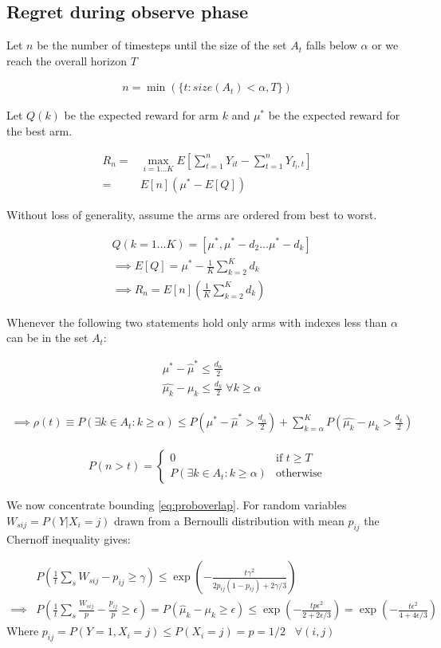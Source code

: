 \documentclass{article}
\newcommand{\eqn}[1]{\begin{align}#1\end{align}}
\theoremstyle{plain}
\theoremstyle{definition}
\begin{document}
\subsection{Regret during observe phase}

Let $n$ be the number of timesteps until the size of the set $A_t$ falls below $\alpha$ or we reach the overall horizon $T$

\eqn {
n = \min(\{t:size(A_t)< \alpha, T\})
}

Let $Q(k)$ be the expected reward for arm $k$ and $\mu^*$ be the expected reward for the best arm.

\eqn {
R_n = & \max_{i=1...K} E\left[\sum_{t=1}^n Y_{it} - \sum_{t=1}^n Y_{I_t,t} \right] \\
= & E[n]\left(\mu^*  - E[Q]\right) 
}

Without loss of generality, assume the arms are ordered from best to worst.

\eqn{
& Q(k = 1...K) = [\mu^*, \mu^*-d_2 ... \mu^*-d_k] \\
&\implies E[Q] = \mu^* - \frac{1}{K}\sum_{k=2}^K d_k \\
&\implies  R_n = E[n]\left(\frac{1}{K}\sum_{k=2}^K d_k \right)
}

Whenever the following two statements hold only arms with indexes less than $\alpha$ can be in the set $A_t$:

\eqn {
& \mu^* - \hat{\mu}^* \leq \frac{d_\alpha}{2} \\
& \hat{\mu_k} - \mu_k \leq \frac{d_k}{2} \; \forall k \geq \alpha 
}

\eqn{
\label{eq:proboverlap}
\implies \rho(t) \equiv P(\exists k \in A_t: k \geq \alpha)  \leq P(\mu^* - \hat{\mu}^* > \frac{d_\alpha}{2}) + \sum_{k=\alpha}^K P( \hat{\mu_k} - \mu_k > \frac{d_k}{2})
}


\eqn {
P(n > t) = \begin{cases} 0 & \text{if } t \geq T \\
P(\exists k \in A_t: k \geq \alpha) & \text{otherwise}
\end{cases}
}


We now concentrate bounding \ref{eq:proboverlap}. For random variables $W_{sij} = P(Y|X_i=j)$ drawn from a Bernoulli distribution with mean $p_{ij}$ the Chernoff inequality gives:

\eqn {
& P(\frac{1}{t}\sum_s W_{sij} - p_{ij} \geq \gamma) \leq \exp(-\frac{t\gamma^2}{2p_{ij}(1-p_{ij})+2\gamma/3}) \\
\implies & P(\frac{1}{t}\sum_s \frac{W_{sij}}{p} - \frac{p_{ij}}{p} \geq \epsilon) = P(\hat{\mu}_k - \mu_k \geq \epsilon) \leq \exp(-\frac{tp\epsilon^2}{2+2\epsilon/3}) = \exp(-\frac{t\epsilon^2}{4+4\epsilon/3})
}
Where $p_{ij} = P(Y = 1, X_i = j) \leq P(X_i=j) = p = 1/2 \;\;\; \forall(i,j)$
\end{document}
